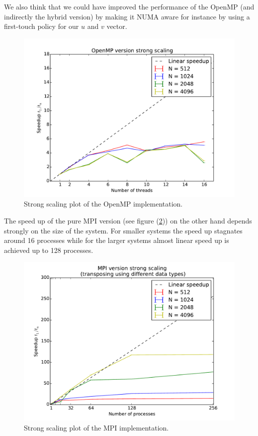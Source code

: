\documentclass[11pt,a4paper]{article} %
\begin{document}
We also think that we could have improved the performance of the OpenMP (and indirectly the hybrid version) by making it NUMA aware for instance by using a first-touch policy for our $u$ and $v$ vector. \\

\begin{figure}
\includegraphics[width=\textwidth]{omp_strong_scaling.pdf}
\caption{Strong scaling plot of the OpenMP implementation.}
\label{fig:omp_strong_scaling}
\end{figure}

The speed up of the pure MPI version (see figure (\ref{fig:mpi_strong_scaling})) on the other hand depends strongly on the size of the system.
For smaller systems the speed up stagnates around 16 processes while for the larger systems almost linear speed up is achieved up to 128 processes. \\

\begin{figure}
\includegraphics[width=\textwidth]{mpi_data_strong_scaling.pdf}
\caption{Strong scaling plot of the MPI implementation.}
\label{fig:mpi_strong_scaling}
\end{figure}
\end{document}
